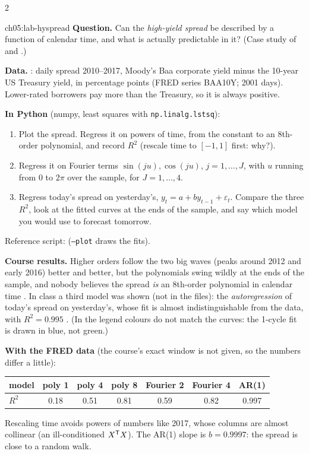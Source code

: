 \begin{paracol}{2}
\begin{lab}{ch05:lab-hyspread}
\textbf{Question.} Can the \emph{high-yield spread} be described by a function of calendar time, and what is
actually predictable in it? (Case study of  and .)

\textbf{Data.} : daily spread 2010--2017, Moody's Baa corporate yield minus the 10-year US
Treasury yield, in percentage points  (FRED series BAA10Y; 2001 days). Lower-rated borrowers pay
more than the Treasury, so it is always positive.

\textbf{In Python} (numpy, least squares with \texttt{np.linalg.lstsq}):
\begin{enumerate}[1.]
  \item Plot the spread. Regress it on powers of time, from the constant to an 8th-order polynomial, and record
        $R^2$ (rescale time to $[-1,1]$ first: why?).
  \item Regress it on Fourier terms $\sin(ju),\cos(ju)$, $j=1,\dots,J$, with $u$ running from 0 to $2\pi$ over the
        sample, for $J=1,\dots,4$.
  \item Regress today's spread on yesterday's, $y_t=a+by_{t-1}+\varepsilon_t$. Compare the three $R^2$, look at the
        fitted curves at the ends of the sample, and say which model you would use to forecast tomorrow.
\end{enumerate}
Reference script:  (\texttt{--plot} draws the fits).
\end{lab}
\begin{solution}
\textbf{Course results.} Higher orders follow the two big waves (peaks around 2012 and early 2016) better and
better, but the polynomials swing wildly at the ends of the sample, and nobody believes the spread
\emph{is} an 8th-order polynomial in calendar time . In class a third model was shown
(not in the files): the \emph{autoregression} of today's spread on yesterday's, whose fit is almost
indistinguishable from the data, with $R^2=0.995$ . (In  the legend colours do not
match the curves: the 1-cycle fit is drawn in blue, not green.)

\textbf{With the FRED data} (the course's exact window is not given, so the numbers differ a little):
\begin{center}\small
\begin{tabular}{@{}lcccccc@{}}
\toprule
model & poly 1 & poly 4 & poly 8 & Fourier 2 & Fourier 4 & AR(1)\\
\midrule
$R^2$ & 0.18 & 0.51 & 0.81 & 0.59 & 0.82 & 0.997\\
\bottomrule
\end{tabular}
\end{center}
Rescaling time avoids powers of numbers like 2017, whose columns are almost collinear (an ill-conditioned
$X^{\mathsf T} X$). The AR(1) slope is $b=0.9997$: the spread is close to a random walk.


\end{solution}
\end{paracol}
